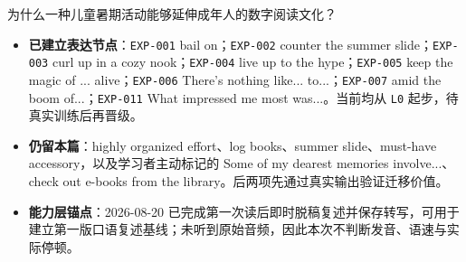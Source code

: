 \documentclass[11pt,a4paper]{ctexart}
\begin{document}


\begin{aiinteraction}{为什么一种儿童暑期活动能够延伸成年人的数字阅读文化？}
\end{aiinteraction}


\begin{itemize}
  \item \textbf{\color{readGreen}已建立表达节点}：\texttt{EXP-001} bail on；\texttt{EXP-002} counter the summer slide；\texttt{EXP-003} curl up in a cozy nook；\texttt{EXP-004} live up to the hype；\texttt{EXP-005} keep the magic of ... alive；\texttt{EXP-006} There's nothing like... to...；\texttt{EXP-007} amid the boom of...；\texttt{EXP-011} What impressed me most was...。当前均从 \texttt{L0} 起步，待真实训练后再晋级。
  \item \textbf{\color{readMain}仍留本篇}：highly organized effort、log books、summer slide、must-have accessory，以及学习者主动标记的 Some of my dearest memories involve...、check out e-books from the library。后两项先通过真实输出验证迁移价值。
  \item \textbf{\color{readGray}能力层锚点}：2026-08-20 已完成第一次读后即时脱稿复述并保存转写，可用于建立第一版口语复述基线；未听到原始音频，因此本次不判断发音、语速与实际停顿。
\end{itemize}
\end{document}
